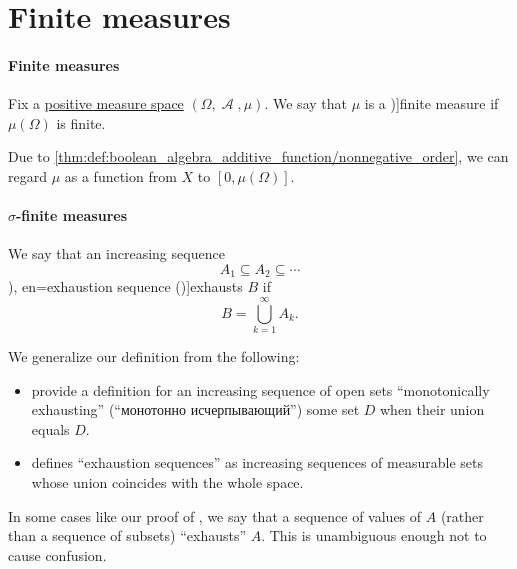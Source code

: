\section{Finite measures}\label{sec:finite_measures}

\paragraph{Finite measures}

\begin{definition}\label{def:finite_measure}
  Fix a \hyperref[def:measure/positive]{positive measure space} \( (\Omega, \mscrA, \mu) \). We say that \( \mu \) is a \term[bg=крайна мярка (\cite[def. 3.11]{Драганов2022ТеорияНаМярката})]{finite measure} if \( \mu(\Omega) \) is finite.

  Due to \cref{thm:def:boolean_algebra_additive_function/nonnegative_order}, we can regard \( \mu \) as a function from \( X \) to \( [0, \mu(\Omega)] \).
\end{definition}

\paragraph{\( \sigma \)-finite measures}

\begin{definition}\label{def:exhausting_sequence}\mimprovised
  We say that an increasing sequence
  \begin{equation*}
    A_1 \subseteq A_2 \subseteq \cdots
  \end{equation*}
  \term[ru=монотонно исчерпывает (\cite[def. 3.8.1]{ИльинСадовничийСендов1987АнализТом2}), en=exhaustion sequence (\cite[13]{Malliavin1995IntegrationAndProbability})]{exhausts} \( B \) if
  \begin{equation*}
    B = \bigcup_{k=1}^\infty A_k.
  \end{equation*}
\end{definition}
\begin{comments}
  \item We generalize our definition from the following:
  \begin{itemize}
    \item \Textcite[def. 3.8.1]{ИльинСадовничийСендов1987АнализТом2} provide a definition for an increasing sequence of open sets \enquote{monotonically exhausting} (\enquote{монотонно исчерпывающий}) some set \( D \) when their union equals \( D \).

    \item \Textcite[13]{Malliavin1995IntegrationAndProbability} defines \enquote{exhaustion sequences} as increasing sequences of measurable sets whose union coincides with the whole space.
  \end{itemize}

  \item In some cases like our proof of , we say that a sequence of values of \( A \) (rather than a sequence of subsets) \enquote{exhausts} \( A \). This is unambiguous enough not to cause confusion.
\end{comments}

